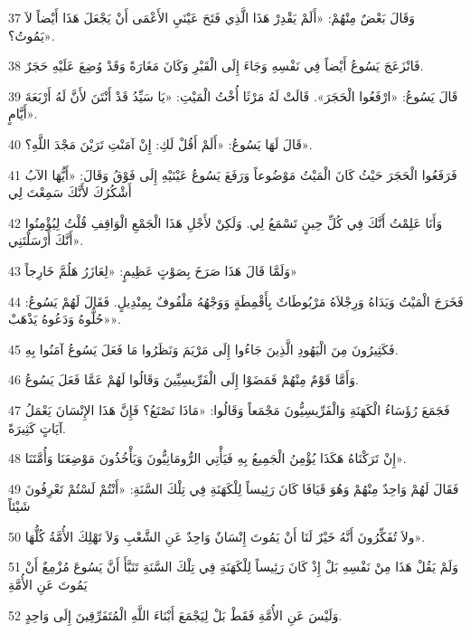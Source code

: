 \par 37 وَقَالَ بَعْضٌ مِنْهُمْ: «أَلَمْ يَقْدِرْ هَذَا الَّذِي فَتَحَ عَيْنَيِ الأَعْمَى أَنْ يَجْعَلَ هَذَا أَيْضاً لاَ يَمُوتُ؟».
\par 38 فَانْزَعَجَ يَسُوعُ أَيْضاً فِي نَفْسِهِ وَجَاءَ إِلَى الْقَبْرِ وَكَانَ مَغَارَةً وَقَدْ وُضِعَ عَلَيْهِ حَجَرٌ.
\par 39 قَالَ يَسُوعُ: «ارْفَعُوا الْحَجَرَ». قَالَتْ لَهُ مَرْثَا أُخْتُ الْمَيْتِ: «يَا سَيِّدُ قَدْ أَنْتَنَ لأَنَّ لَهُ أَرْبَعَةَ أَيَّامٍ».
\par 40 قَالَ لَهَا يَسُوعُ: «أَلَمْ أَقُلْ لَكِ: إِنْ آمَنْتِ تَرَيْنَ مَجْدَ اللَّهِ؟».
\par 41 فَرَفَعُوا الْحَجَرَ حَيْثُ كَانَ الْمَيْتُ مَوْضُوعاً وَرَفَعَ يَسُوعُ عَيْنَيْهِ إِلَى فَوْقُ وَقَالَ: «أَيُّهَا الآبُ أَشْكُرُكَ لأَنَّكَ سَمِعْتَ لِي
\par 42 وَأَنَا عَلِمْتُ أَنَّكَ فِي كُلِّ حِينٍ تَسْمَعُ لِي. وَلَكِنْ لأَجْلِ هَذَا الْجَمْعِ الْوَاقِفِ قُلْتُ لِيُؤْمِنُوا أَنَّكَ أَرْسَلْتَنِي».
\par 43 وَلَمَّا قَالَ هَذَا صَرَخَ بِصَوْتٍ عَظِيمٍ: «لِعَازَرُ هَلُمَّ خَارِجاً»
\par 44 فَخَرَجَ الْمَيْتُ وَيَدَاهُ وَرِجْلاَهُ مَرْبُوطَاتٌ بِأَقْمِطَةٍ وَوَجْهُهُ مَلْفُوفٌ بِمِنْدِيلٍ. فَقَالَ لَهُمْ يَسُوعُ: «حُلُّوهُ وَدَعُوهُ يَذْهَبْ».
\par 45 فَكَثِيرُونَ مِنَ الْيَهُودِ الَّذِينَ جَاءُوا إِلَى مَرْيَمَ وَنَظَرُوا مَا فَعَلَ يَسُوعُ آمَنُوا بِهِ.
\par 46 وَأَمَّا قَوْمٌ مِنْهُمْ فَمَضَوْا إِلَى الْفَرِّيسِيِّينَ وَقَالُوا لَهُمْ عَمَّا فَعَلَ يَسُوعُ.
\par 47 فَجَمَعَ رُؤَسَاءُ الْكَهَنَةِ وَالْفَرِّيسِيُّونَ مَجْمَعاً وَقَالُوا: «مَاذَا نَصْنَعُ؟ فَإِنَّ هَذَا الإِنْسَانَ يَعْمَلُ آيَاتٍ كَثِيرَةً.
\par 48 إِنْ تَرَكْنَاهُ هَكَذَا يُؤْمِنُ الْجَمِيعُ بِهِ فَيَأْتِي الرُّومَانِيُّونَ وَيَأْخُذُونَ مَوْضِعَنَا وَأُمَّتَنَا».
\par 49 فَقَالَ لَهُمْ وَاحِدٌ مِنْهُمْ وَهُوَ قَيَافَا كَانَ رَئِيساً لِلْكَهَنَةِ فِي تِلْكَ السَّنَةِ: «أَنْتُمْ لَسْتُمْ تَعْرِفُونَ شَيْئاً
\par 50 ولاَ تُفَكِّرُونَ أَنَّهُ خَيْرٌ لَنَا أَنْ يَمُوتَ إِنْسَانٌ وَاحِدٌ عَنِ الشَّعْبِ وَلاَ تَهْلِكَ الأُمَّةُ كُلُّهَا».
\par 51 وَلَمْ يَقُلْ هَذَا مِنْ نَفْسِهِ بَلْ إِذْ كَانَ رَئِيساً لِلْكَهَنَةِ فِي تِلْكَ السَّنَةِ تَنَبَّأَ أَنَّ يَسُوعَ مُزْمِعٌ أَنْ يَمُوتَ عَنِ الأُمَّةِ
\par 52 وَلَيْسَ عَنِ الأُمَّةِ فَقَطْ بَلْ لِيَجْمَعَ أَبْنَاءَ اللَّهِ الْمُتَفَرِّقِينَ إِلَى وَاحِدٍ.
